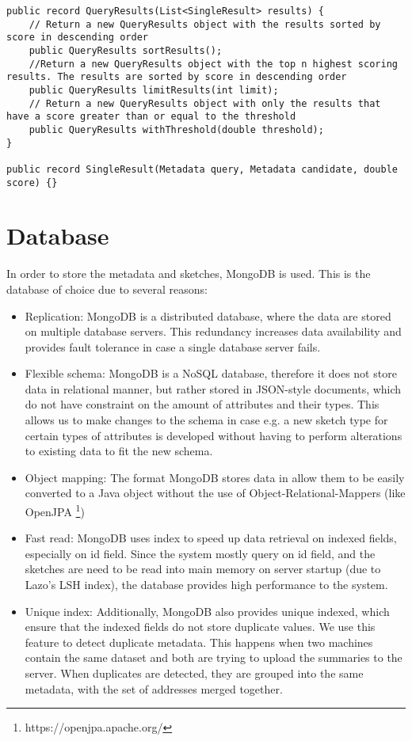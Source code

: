 \begin{lstlisting}[caption={QueryResults class and the various methods to sort, filter, and limit matches}, label=lst:queryResults]
public record QueryResults(List<SingleResult> results) {
    // Return a new QueryResults object with the results sorted by score in descending order
    public QueryResults sortResults();
    //Return a new QueryResults object with the top n highest scoring results. The results are sorted by score in descending order
    public QueryResults limitResults(int limit);
    // Return a new QueryResults object with only the results that have a score greater than or equal to the threshold
    public QueryResults withThreshold(double threshold);
}

public record SingleResult(Metadata query, Metadata candidate, double score) {}
\end{lstlisting}

\section{Database}

In order to store the metadata and sketches, MongoDB is used. This is the database of choice due to several reasons:

\begin{itemize}
    \item Replication: MongoDB is a distributed database, where the data are stored on multiple database servers. This redundancy increases data availability and provides fault tolerance in case a single database server fails.
    \item Flexible schema: MongoDB is a NoSQL database, therefore it does not store data in relational manner, but rather stored in JSON-style documents, which do not have constraint on the amount of attributes and their types. This allows us to make changes to the schema in case e.g. a new sketch type for certain types of attributes is developed without having to perform alterations to existing data to fit the new schema.
    \item Object mapping: The format MongoDB stores data in allow them to be easily converted to a Java object without the use of Object-Relational-Mappers (like OpenJPA \footnote{https://openjpa.apache.org/})
    \item Fast read: MongoDB uses index to speed up data retrieval on indexed fields, especially on id field. Since the system mostly query on id field, and the sketches are need to be read into main memory on server startup (due to Lazo's LSH index), the database provides high performance to the system.
    \item Unique index: Additionally, MongoDB also provides unique indexed, which ensure that the indexed fields do not store duplicate values. We use this feature to detect duplicate metadata. This happens when two machines contain the same dataset and both are trying to upload the summaries to the server. When duplicates are detected, they are grouped into the same metadata, with the set of addresses merged together.
\end{itemize}

